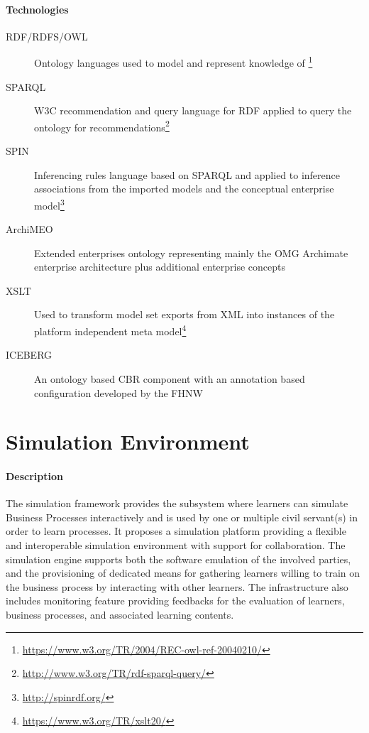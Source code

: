 \documentclass{learnpad}
\begin{document}
\paragraph{Technologies}
\begin{description}
	\item[RDF/RDFS/OWL] Ontology languages used to model and represent knowledge
		of
		\learnpad\footnote{\url{https://www.w3.org/TR/2004/REC-owl-ref-20040210/}}
	\item[SPARQL] W3C recommendation and query language for RDF applied to query
		the ontology for
		recommendations\footnote{\url{http://www.w3.org/TR/rdf-sparql-query/}}
	\item[SPIN] Inferencing rules language based on SPARQL and applied to
		inference associations from the imported models and the conceptual
		enterprise model\footnote{\url{http://spinrdf.org/}}
	\item[ArchiMEO] Extended enterprises ontology representing mainly the OMG
		Archimate enterprise architecture plus additional enterprise concepts
	\item[XSLT] Used to transform model set exports from XML into instances of
		the platform independent meta
		model\footnote{\url{https://www.w3.org/TR/xslt20/}}
	\item[ICEBERG] An ontology based CBR component with an annotation based
		configuration developed by the FHNW
\end{description}

\section{Simulation Environment}\label{sec:simulation-environment}
\paragraph{Description}
The simulation framework provides the subsystem where learners can simulate
Business Processes interactively and is used by one or multiple civil servant(s)
in order to learn processes. It proposes a simulation platform providing a
flexible and interoperable simulation environment with support for
collaboration. The simulation engine supports both the software emulation of the
involved parties, and the provisioning of dedicated means for gathering learners
willing to train on the business process by interacting with other learners. The
infrastructure also includes monitoring feature providing feedbacks for the
evaluation of learners, business processes, and associated learning contents.
\end{document}
